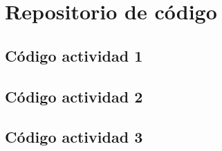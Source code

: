 \chapter{Repositorio de código}
\label{ap:osc}
\section{Código actividad 1}
\label{ApendiceA1}
{\scriptsize 
    
}

\section{Código actividad 2}
\label{ApendiceA2}
{\scriptsize 
    
}	


\section{Código actividad 3}
\label{ApendiceA3}
{\scriptsize 
    
}